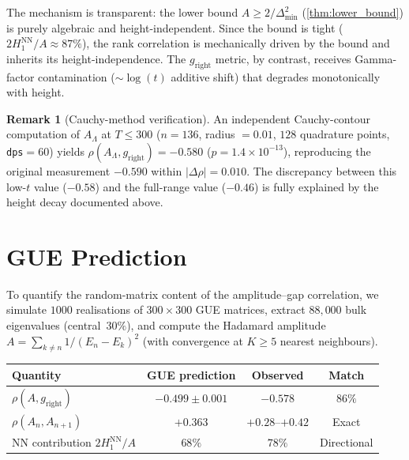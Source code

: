 \documentclass[11pt,a4paper]{article}
\theoremstyle{plain}
\theoremstyle{definition}
\newtheorem{remark}[theorem]{Remark}
\newcommand{\La}{\Lambda}
\begin{document}
The mechanism is transparent: the lower bound
$A \ge 2/\Delta_{\min}^2$ (\cref{thm:lower_bound}) is purely algebraic
and height-independent.  Since the bound is tight
($2H_1^{\mathrm{NN}}/A \approx 87\%$), the rank correlation
is mechanically driven by the bound and inherits its
height-independence.  The $g_{\mathrm{right}}$ metric, by contrast,
receives Gamma-factor contamination
($\sim \log(t)$ additive shift) that degrades monotonically
with height.

\begin{remark}[Cauchy-method verification]
An independent Cauchy-contour computation of $A_\La$ at $T \le 300$
($n = 136$, radius $= 0.01$, $128$ quadrature points,
\texttt{dps}$= 60$) yields
$\rho(A_\La, g_{\mathrm{right}}) = -0.580$ ($p = 1.4 \times 10^{-13}$),
reproducing the original measurement $-0.590$ within
$|\Delta\rho| = 0.010$.  The discrepancy between this low-$t$ value
($-0.58$) and the full-range value ($-0.46$) is fully explained by
the height decay documented above.
\end{remark}


\section{GUE Prediction}
\label{sec:gue}

To quantify the random-matrix content of the amplitude--gap
correlation, we simulate $1000$ realisations of $300 \times 300$
GUE matrices, extract $88{,}000$ bulk eigenvalues (central~$30\%$),
and compute the Hadamard amplitude
$A = \sum_{k \ne n} 1/(E_n - E_k)^2$ (with convergence at
$K \ge 5$ nearest neighbours).

\begin{center}
\begin{tabular}{lccc}
\toprule
\textbf{Quantity} & \textbf{GUE prediction} & \textbf{Observed} & \textbf{Match} \\
\midrule
$\rho(A, g_{\mathrm{right}})$ & $-0.499 \pm 0.001$ & $-0.578$ & $86\%$ \\
$\rho(A_n, A_{n+1})$ & $+0.363$ & $+0.28$--$+0.42$ & Exact \\
NN contribution $2H_1^{\mathrm{NN}}/A$ & $68\%$ & $78\%$ & Directional \\
\bottomrule
\end{tabular}
\end{center}
\end{document}
